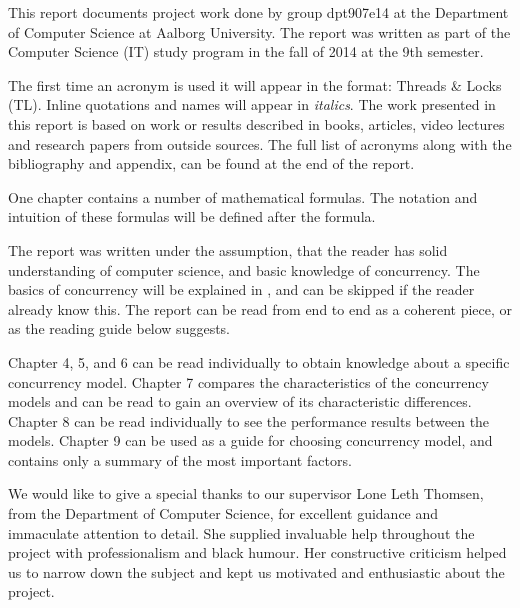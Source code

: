 \makeatletter {}\makeatother
{}
This report documents project work done by group dpt907e14 at the Department of Computer Science at Aalborg University. The report was written as part of the Computer Science (IT) study program in the fall of 2014 at the 9th semester.

The first time an acronym is used it will appear in the format: Threads \& Locks (TL). Inline quotations and names will appear in \textit{italics}. The work presented in this report is based on work or results described in books, articles, video lectures and research papers from outside sources. The full list of acronyms along with the bibliography and appendix, can be found at the end of the report.

One chapter contains a number of mathematical formulas. The notation and intuition of these formulas will be defined after the formula.

The report was written under the assumption, that the reader has solid understanding of computer science, and basic knowledge of concurrency. The basics of concurrency will be explained in , and can be skipped if the reader already know this. The report can be read from end to end as a coherent piece, or as the reading guide below suggests.

Chapter 4, 5, and 6 can be read individually to obtain knowledge about a specific concurrency model. Chapter 7 compares the characteristics of the concurrency models and can be read to gain an overview of its characteristic differences. Chapter 8 can be read individually to see the performance results between the models. Chapter 9 can be used as a guide for choosing concurrency model, and contains only a summary of the most important factors.

We would like to give a special thanks to our supervisor Lone Leth Thomsen, from the Department of Computer Science, for excellent guidance and immaculate attention to detail. She supplied invaluable help throughout the project with professionalism and black humour. Her constructive criticism helped us to narrow down the subject and kept us motivated and enthusiastic about the project.


